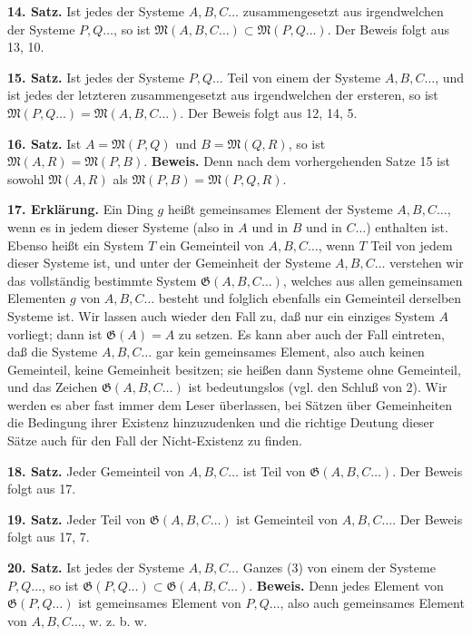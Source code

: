 \documentclass[11pt]{article}
\newcommand{\Mf}{\mathfrak{M}}
\newcommand{\Gf}{\mathfrak{G}}
\newcommand{\partof}{\mathrel{\subset}}
\begin{document}
\noindent\textbf{14. Satz.} Ist jedes der Systeme $A,B,C\ldots$ zusammengesetzt aus irgendwelchen der Systeme $P,Q\ldots$, so ist $\Mf(A,B,C\ldots)\partof\Mf(P,Q\ldots)$. Der Beweis folgt aus 13, 10.

\noindent\textbf{15. Satz.} Ist jedes der Systeme $P,Q\ldots$ Teil von einem der Systeme $A,B,C\ldots$, und ist jedes der letzteren zusammengesetzt aus irgendwelchen der ersteren, so ist $\Mf(P,Q\ldots)=\Mf(A,B,C\ldots)$. Der Beweis folgt aus 12, 14, 5.

\noindent\textbf{16. Satz.} Ist $A=\Mf(P,Q)$ und $B=\Mf(Q,R)$, so ist $\Mf(A,R)=\Mf(P,B)$. \textbf{Beweis.} Denn nach dem vorhergehenden Satze 15 ist sowohl $\Mf(A,R)$ als $\Mf(P,B)=\Mf(P,Q,R)$.

\noindent\textbf{17. Erklärung.} Ein Ding $g$ heißt gemeinsames Element der Systeme $A,B,C\ldots$, wenn es in jedem dieser Systeme (also in $A$ und in $B$ und in $C\ldots$) enthalten ist. Ebenso heißt ein System $T$ ein Gemeinteil von $A,B,C\ldots$, wenn $T$ Teil von jedem dieser Systeme ist, und unter der Gemeinheit der Systeme $A,B,C\ldots$ verstehen wir das vollständig bestimmte System $\Gf(A,B,C\ldots)$, welches aus allen gemeinsamen Elementen $g$ von $A,B,C\ldots$ besteht und folglich ebenfalls ein Gemeinteil derselben Systeme ist. Wir lassen auch wieder den Fall zu, daß nur ein einziges System $A$ vorliegt; dann ist $\Gf(A)=A$ zu setzen. Es kann aber auch der Fall eintreten, daß die Systeme $A,B,C\ldots$ gar kein gemeinsames Element, also auch keinen Gemeinteil, keine Gemeinheit besitzen; sie heißen dann Systeme ohne Gemeinteil, und das Zeichen $\Gf(A,B,C\ldots)$ ist bedeutungslos (vgl. den Schluß von 2). Wir werden es aber fast immer dem Leser überlassen, bei Sätzen über Gemeinheiten die Bedingung ihrer Existenz hinzuzudenken und die richtige Deutung dieser Sätze auch für den Fall der Nicht-Existenz zu finden.

\noindent\textbf{18. Satz.} Jeder Gemeinteil von $A,B,C\ldots$ ist Teil von $\Gf(A,B,C\ldots)$. Der Beweis folgt aus 17.

\noindent\textbf{19. Satz.} Jeder Teil von $\Gf(A,B,C\ldots)$ ist Gemeinteil von $A,B,C\ldots$. Der Beweis folgt aus 17, 7.

\noindent\textbf{20. Satz.} Ist jedes der Systeme $A,B,C\ldots$ Ganzes (3) von einem der Systeme $P,Q\ldots$, so ist $\Gf(P,Q\ldots)\partof\Gf(A,B,C\ldots)$. \textbf{Beweis.} Denn jedes Element von $\Gf(P,Q\ldots)$ ist gemeinsames Element von $P,Q\ldots$, also auch gemeinsames Element von $A,B,C\ldots$, w. z. b. w.
\end{document}
